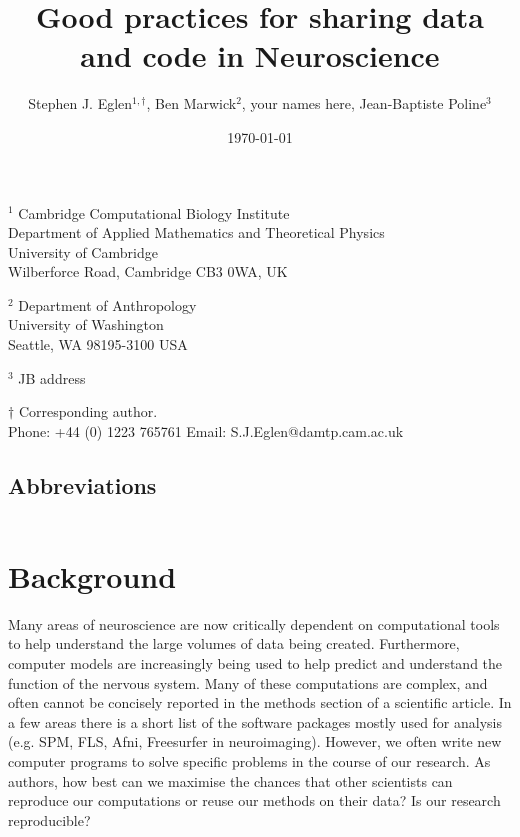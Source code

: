 \documentclass[11pt]{article}
\begin{document}
\doublespacing

\title{Good practices for sharing data and code in Neuroscience}

\author{Stephen J. Eglen$^{1,\dagger}$, Ben Marwick${^2}$, your names here, Jean-Baptiste Poline${^3}$}
\date{\today}
\maketitle

\noindent $^{1}$ 
Cambridge Computational Biology Institute\\
Department of Applied Mathematics and Theoretical Physics\\
University of Cambridge\\
Wilberforce Road, Cambridge CB3 0WA, UK
\vspace*{2mm}

\noindent $^{2}$ 
Department of Anthropology\\
University of Washington\\
Seattle, WA 98195-3100 USA 
\vspace*{2mm}

\noindent $^3$ JB address

\vspace*{2mm}


\noindent $\dagger$
Corresponding author.\\
\noindent Phone: +44 (0) 1223 765761
\noindent Email: S.J.Eglen@damtp.cam.ac.uk



\vspace*{2cm}
\subsection*{Abbreviations}
\begin{tabular}{ll}
\end{tabular}


\clearpage


\renewcommand{\cite}[1]{\autocite{#1}}

\linenumbers

\section*{Background}

Many areas of neuroscience are now critically dependent on
computational tools to help understand the large volumes of data being
created.  Furthermore, computer models are increasingly being used to
help predict and understand the function of the nervous system.  Many
of these computations are complex, and often cannot be concisely
reported in the methods section of a scientific article.  In a few
areas there is a short list of the software packages mostly used for analysis
(e.g. SPM, FLS, Afni, Freesurfer in neuroimaging).  However, we often write new computer programs to solve specific problems in the course of our research.  As authors, how best can we
maximise the chances that other scientists can reproduce our
computations or reuse our methods on their data?  Is our research reproducible?
\end{document}
